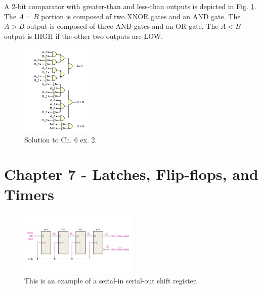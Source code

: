 \documentclass[10pt]{article}
\begin{document}
\begin{enumerate}
A 2-bit comparator with greater-than and less-than outputs is depicted in Fig. \ref{fig:comp}.  The $A=B$ portion is composed of two XNOR gates and an AND gate.  The $A > B$ output is composed of three AND gates and an OR gate.  The $A < B$ output is HIGH if the other two outputs are LOW.
\begin{figure}
\centering
\includegraphics[width=0.3\textwidth]{figures/gateExample11.pdf}
\caption{\label{fig:comp} Solution to Ch. 6 ex. 2.}
\end{figure}
\end{enumerate}

\section{Chapter 7 - Latches, Flip-flops, and Timers}
\label{sec:latch}

\begin{figure}[ht]
\centering
\includegraphics[width=0.5\textwidth,trim=0cm 2cm 0cm 2cm,clip=true]{figures/latches2.pdf}
\caption{\label{fig:latches} This is an example of a serial-in serial-out shift register.}
\end{figure}
\end{document}
